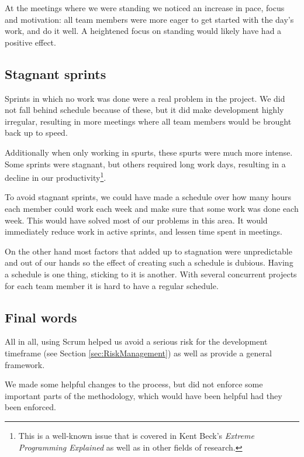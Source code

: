 At the meetings where we were standing we noticed an increase in pace, focus and motivation: all team members
were more eager to get started with the day's work, and do it well. A heightened focus on standing would
likely have had a positive effect.

\subsection{Stagnant sprints}

Sprints in which no work was done were a real problem in the project. We did not fall behind schedule because
of these, but it did make development highly irregular, resulting in more meetings where all team members
would be brought back up to speed.

Additionally when only working in spurts, these spurts were much more intense. Some sprints were stagnant, but
others required long work days, resulting in a decline in our productivity\footnote{This is a well-known issue
that is covered in Kent Beck's \emph{Extreme Programming Explained}\cite{xpe} as well as in other fields of
research\cite{workingtime}.}.

To avoid stagnant sprints, we could have made a schedule over how many hours each member could work each week
and make sure that some work was done each week. This would have solved most of our problems in this area. It
would immediately reduce work in active sprints, and lessen time spent in meetings.

On the other hand most factors that added up to stagnation were unpredictable and out of our hands so the effect
of creating such a schedule is dubious. Having a schedule is one thing, sticking to it is another. With several
concurrent projects for each team member it is hard to have a regular schedule.

\subsection{Final words}

All in all, using Scrum helped us avoid a serious risk for the development timeframe (see Section 
\ref{sec:RiskManagement}) as well as provide a general framework.

We made some helpful changes to the process, but did not enforce some important parts of the methodology, which
would have been helpful had they been enforced.